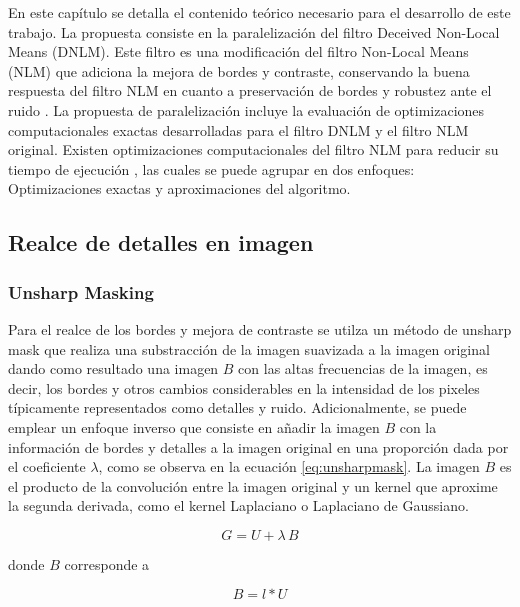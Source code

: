 En este cap\'itulo se detalla el contenido te\'orico necesario para el desarrollo de este trabajo. La propuesta consiste en la paralelizaci\'on del filtro Deceived Non-Local Means (DNLM). Este filtro es una modificaci\'on del filtro Non-Local Means (NLM) que adiciona la mejora de bordes y contraste, conservando la buena respuesta del filtro NLM en cuanto a preservaci\'on de bordes y robustez ante el ruido \cite{calderon2015dewaff}. La propuesta de paralelizaci\'on incluye la evaluaci\'on de optimizaciones computacionales exactas desarrolladas para el filtro DNLM y el filtro NLM original. Existen optimizaciones computacionales del filtro NLM para reducir su tiempo de ejecuci\'on , las cuales se puede agrupar en dos enfoques: Optimizaciones exactas y aproximaciones del algoritmo.  



\subsection{Realce de detalles en imagen}

\subsubsection{Unsharp Masking}

Para el realce de los bordes y mejora de contraste se utilza un m\'etodo de unsharp mask que realiza una substracci\'on de la imagen suavizada a la imagen original dando como resultado una imagen $B$ con las altas frecuencias de la imagen, es decir, los bordes y otros cambios considerables en la intensidad de los pixeles t\'ipicamente representados como detalles y ruido. Adicionalmente, se puede emplear un enfoque inverso que consiste en a\~nadir la imagen $B$ con la informaci\'on de bordes y detalles a la imagen original en una proporci\'on dada por el coeficiente $\lambda$, como se observa en la ecuaci\'on \ref{eq:unsharpmask}. La imagen $B$ es el producto de la convoluci\'on entre la imagen original y un kernel que aproxime la segunda derivada, como el kernel Laplaciano o Laplaciano de Gaussiano.

\begin{equation}
\label{eq:unsharpmask}
G=U+\lambda\,B
\end{equation}

donde $B$ corresponde a

\begin{equation}
\label{eq:unsharfilter}
B=l*U
\end{equation}

